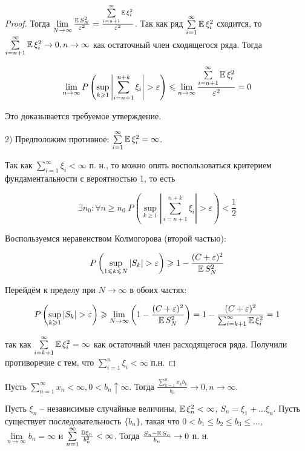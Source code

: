 \begin{proof}
Тогда \( \lim \limits_{N \to \infty} \frac{\operatorname{\mathbb{E}} S_N^2}{\varepsilon^2} = 
\frac{\sum \limits_{i = n + 1}^{\infty} \operatorname{\mathbb{E}} \xi_i^2}{\varepsilon^2} \).
Так как ряд \( \sum \limits_{i = 1}^{\infty} \operatorname{\mathbb{E}} \xi_i^2 \) сходится, то
\( \sum \limits_{i = n + 1}^{\infty} \operatorname{\mathbb{E}} \xi_i^2 \to 0, n \to \infty \) как остаточный
член сходящегося ряда. Тогда 

\[
\lim_{n \to \infty} P \left( \sup_{k \geqslant 1} 
\left| \sum_{i = n + 1}^{n + k} \xi_i \right| > \varepsilon \right) \leqslant
\lim_{n \to \infty} \frac{\sum \limits_{i = n + 1}^{\infty} \operatorname{\mathbb{E}} \xi_i^2}{\varepsilon^2} = 0
\]

Это доказывается требуемое утверждение.

2) Предположим противное: \( \sum \limits_{i = 1}^{\infty} \operatorname{\mathbb{E}} \xi_i^2 = \infty \).

Так как \( \sum \limits_{i = 1}^{\infty} \xi_i < \infty \) п. н., то можно опять
воспользоваться критерием фундаментальности с вероятностью 1, то есть

\[
\exists n_0 : \forall n \geqslant n_0 \; 
P \left( \sup_{k \geqslant 1} \left| \sum_{i = n + 1}^{n + k} \xi_i \right| 
> \varepsilon \right) < \frac{1}{2}
\]

Воспользуемся неравенством Колмогорова (второй частью):

\[
P \left( \sup_{1 \leqslant k \leqslant N} |S_k| > \varepsilon \right) \geqslant
1 - \frac{(C + \varepsilon)^2}{\operatorname{\mathbb{E}} S_N^2}
\]

Перейдём к пределу при \( N \to \infty \) в обоих частях:

\[
P \left( \sup_{k \geqslant 1} |S_k| > \varepsilon \right) \geqslant 
\lim_{N \to \infty} \left( 1 - \frac{(C + \varepsilon)^2}{\operatorname{\mathbb{E}} S_N^2} \right) = 
1 - \frac{(C + \varepsilon)^2}{\sum_{i = k + 1}^{\infty} \operatorname{\mathbb{E}} \xi_i^2} = 1
\]

так как \( \sum \limits_{i = k + 1}^{\infty} \operatorname{\mathbb{E}} \xi_i^2  = \infty \) как остаточный член 
расходящегося ряда. Получили противоречие с тем, что 
\( \sum \limits_{i = 1}^n \xi_i < \infty \) п.н.

\end{proof}

\begin{lemma}[Кронекера (б/д)]
Пусть \( \sum \limits_{n = 1}^{\infty} x_n < \infty , 0 < b_n \uparrow \infty \).
Тогда \( \frac{\sum \limits_{k = 1}^n x_k b_k}{b_n} \to 0, n \to \infty \).
\end{lemma}

\begin{theorem}[УЗБЧ 1]

Пусть \( \xi_n \) -- независимые случайные величины, \( \operatorname{\mathbb{E}} \xi_n^2 < \infty \), 
\( S_n = \xi_1 + \dots \xi_n \). Пусть существует последовательность \( \{b_n\} \), такая
что \( 0 < b_1 \leqslant b_2 \leqslant b_3 \leqslant \dots \), 
\( \lim \limits_{n \to \infty} b_n = \infty\) и 
\( \sum \limits_{n = 1}^{\infty} \frac{{\mathbb{D}} \xi_n}{b_n^2} < \infty \). 
Тогда \( \frac{S_n - \operatorname{\mathbb{E}} S_n}{b_n} \to 0 \) п. н.
\end{theorem}

